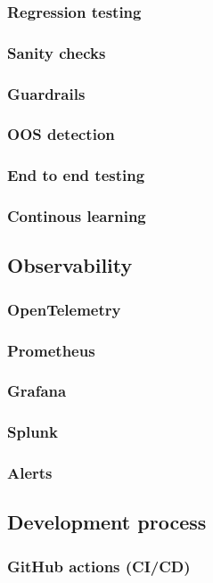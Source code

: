 \documentclass[12pt, a4paper, oneside, romanian, draft]{teza-upb}
\begin{document}
      \subsubsection{Regression testing}
      \subsubsection{Sanity checks}
      \subsubsection{Guardrails}
      \subsubsection{OOS detection}
      \subsubsection{End to end testing}
      \subsubsection{Continous learning}
    \subsection{Observability}
      \subsubsection{OpenTelemetry}
      \subsubsection{Prometheus}
      \subsubsection{Grafana}
      \subsubsection{Splunk}
      \subsubsection{Alerts}
    \subsection{Development process}
      \subsubsection{GitHub actions (CI/CD)}
\end{document}
